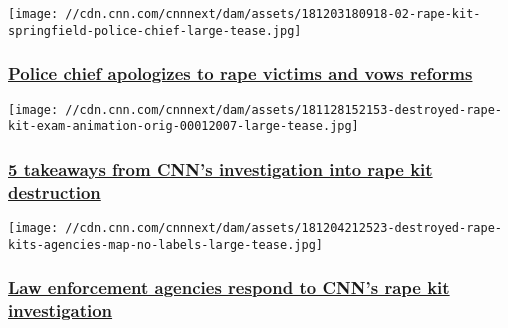\href{/2018/12/03/health/rape-kit-destroyed-reaction-springfield-missouri-invs/index.html}{}

\texttt{[image: //cdn.cnn.com/cnnnext/dam/assets/181203180918-02-rape-kit-springfield-police-chief-large-tease.jpg]}

\hypertarget{police-chief-apologizes-to-rape-victims-and-vows-reforms}{%
\subsubsection{\texorpdfstring{\href{/2018/12/03/health/rape-kit-destroyed-reaction-springfield-missouri-invs/index.html}{Police
chief apologizes to rape victims and vows
reforms}}{Police chief apologizes to rape victims and vows reforms}}\label{police-chief-apologizes-to-rape-victims-and-vows-reforms}}

\href{/2018/11/29/health/destroyed-rape-kits-takeaways-invs/index.html}{}

\texttt{[image: //cdn.cnn.com/cnnnext/dam/assets/181128152153-destroyed-rape-kit-exam-animation-orig-00012007-large-tease.jpg]}

\hypertarget{5-takeaways-from-cnns-investigation-into-rape-kit-destruction}{%
\subsubsection{\texorpdfstring{\href{/2018/11/29/health/destroyed-rape-kits-takeaways-invs/index.html}{5
takeaways from CNN's investigation into rape kit
destruction}}{5 takeaways from CNN's investigation into rape kit destruction}}\label{5-takeaways-from-cnns-investigation-into-rape-kit-destruction}}

\href{https://www.cnn.com/interactive/2018/11/investigates/police-destroyed-rapekits/responses.html}{}

\texttt{[image: //cdn.cnn.com/cnnnext/dam/assets/181204212523-destroyed-rape-kits-agencies-map-no-labels-large-tease.jpg]}

\hypertarget{law-enforcement-agencies-respond-to-cnns-rape-kit-investigation}{%
\subsubsection{\texorpdfstring{\href{https://www.cnn.com/interactive/2018/11/investigates/police-destroyed-rapekits/responses.html}{Law
enforcement agencies respond to CNN's rape kit
investigation}}{Law enforcement agencies respond to CNN's rape kit investigation}}\label{law-enforcement-agencies-respond-to-cnns-rape-kit-investigation}}

